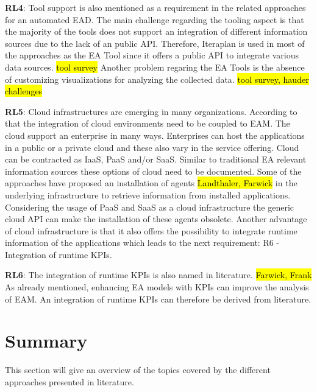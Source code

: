 \textbf{RL4}: Tool support is also mentioned as a requirement in the related approaches for an automated EAD. The main challenge regarding the tooling aspect is that the majority of the tools does not support an integration of different information sources due to the lack of an public API. Therefore, Iteraplan is used in most of the approaches as the EA Tool since it offers a public API to integrate various data sources. \hl{tool survey} Another problem regaring the EA Tools is the absence of customizing visualizations for analyzing the collected data. \hl{tool survey, hauder challenges} 

\textbf{RL5}: Cloud infrastructures are emerging in many organizations. According to that the integration of cloud environments need to be coupled to EAM. The cloud support an enterprise in many ways. Enterprises can host the applications in a public or a private cloud and these also vary in the service offering. Cloud can be contracted as IaaS, PaaS and/or SaaS. Similar to traditional EA relevant information sources these options of cloud need to be documented. Some of the approaches have proposed an installation of agents \hl{Landthaler, Farwick} in the underlying infrastructure to retrieve information from installed applications. Considering the usage of PaaS and SaaS as a cloud infrastructure the generic cloud API can make the installation of these agents obsolete. Another advantage of cloud infrastructure is that it also offers the possibility to integrate runtime information of the applications which leads to the next requirement: R6 - Integration of runtime KPIs.

\textbf{RL6}: The integration of runtime KPIs is also named in literature. \hl{Farwick, Frank} As already mentioned, enhancing EA models with KPIs can improve the analysis of EAM. An integration of runtime KPIs can therefore be derived from literature.


\section{Summary}

This section will give an overview of the topics covered by the different approaches presented in literature. 

